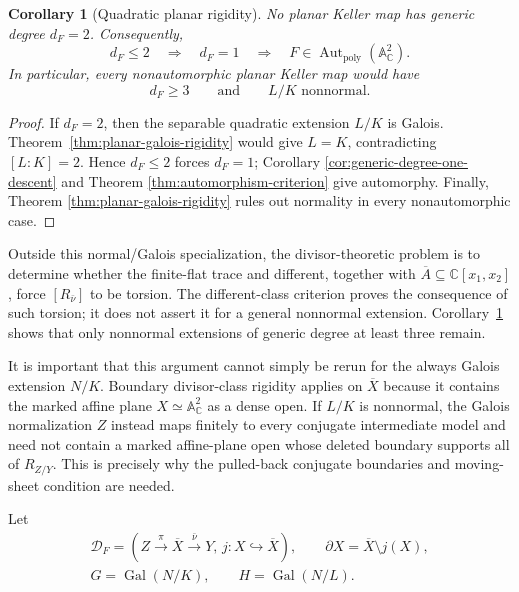 \documentclass[11pt]{article}
\newtheorem{corollary}[theorem]{Corollary}
\theoremstyle{remark}
\theoremstyle{definition}
\DeclareMathOperator{\Gal}{Gal}
\DeclareMathOperator{\Aut}{Aut}
\newcommand{\A}{\mathbb A}
\newcommand{\C}{\mathbb C}
\begin{document}
\begin{corollary}[Quadratic planar rigidity]
\label{cor:quadratic-planar-rigidity}
No planar Keller map has generic degree \(d_F=2\).  Consequently,
\[
  d_F\leq2
  \quad\Longrightarrow\quad
  d_F=1
  \quad\Longrightarrow\quad
  F\in\Aut_{\mathrm{poly}}(\A^2_{\C}).
\]
In particular, every nonautomorphic planar Keller map would have
\[
  d_F\geq3
  \qquad\text{and}\qquad
  L/K\text{ nonnormal}.
\]
\end{corollary}

\begin{proof}
If \(d_F=2\), then the separable quadratic extension \(L/K\) is Galois.
Theorem~\ref{thm:planar-galois-rigidity} would give \(L=K\), contradicting
\([L:K]=2\).  Hence \(d_F\leq2\) forces \(d_F=1\); Corollary
\ref{cor:generic-degree-one-descent} and Theorem
\ref{thm:automorphism-criterion} give automorphy.  Finally, Theorem
\ref{thm:planar-galois-rigidity} rules out normality in every
nonautomorphic case.
\end{proof}

Outside this normal/Galois specialization, the divisor-theoretic problem is
to determine whether the finite-flat trace and different, together with
\(\overline A\subseteq\C[x_1,x_2]\), force
\([R_{\bar\nu}]\) to be torsion.  The different-class criterion proves the
consequence of such torsion; it does not assert it for a general nonnormal
extension.  Corollary~\ref{cor:quadratic-planar-rigidity} shows that only
nonnormal extensions of generic degree at least three remain.

It is important that this argument cannot simply be rerun for the always
Galois extension \(N/K\).  Boundary divisor-class rigidity applies on
\(\overline X\) because it contains the marked affine plane
\(X\simeq\A^2_{\C}\) as a dense open.  If \(L/K\) is nonnormal, the Galois
normalization \(Z\) instead maps finitely to every conjugate intermediate
model and need not contain a marked affine-plane open whose deleted boundary
supports all of \(R_{Z/Y}\).  This is precisely why the pulled-back
conjugate boundaries and moving-sheet condition are needed.

Let
\[
  \begin{gathered}
    \mathcal D_F=
    \left(
      Z\xrightarrow{\pi}\overline X\xrightarrow{\bar\nu}Y,\,
      j\colon X\hookrightarrow\overline X
    \right),
    \qquad
    \partial X=\overline X\setminus j(X),\\
    G=\Gal(N/K),
    \qquad
    H=\Gal(N/L).
  \end{gathered}
\]
\end{document}
